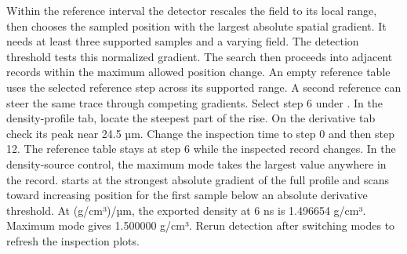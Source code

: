 Within the reference interval the detector rescales the field to its local range, then chooses the sampled position with the largest absolute spatial gradient. It needs at least three supported samples and a varying field. The detection threshold tests this normalized gradient. The search then proceeds into adjacent records within the maximum allowed position change. An empty reference table uses the selected reference step across its supported range. A second reference can steer the same trace through competing gradients.
Select step 6 under . In the density-profile tab, locate the steepest part of the rise. On the derivative tab check its peak near 24.5 µm. Change the inspection time to step 0 and then step 12. The reference table stays at step 6 while the inspected record changes.
In the density-source control, the maximum mode takes the largest value anywhere in the record.  starts at the strongest absolute gradient of the full profile and scans toward increasing position for the first sample below an absolute derivative threshold. At  (g/cm³)/µm, the exported density at 6 ns is 1.496654 g/cm³. Maximum mode gives 1.500000 g/cm³. Rerun detection after switching modes to refresh the inspection plots.

